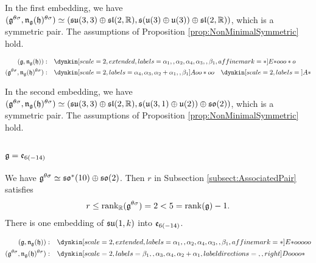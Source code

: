 In the first embedding, we have $(\mathfrak{g}^{\theta\sigma}, \mathfrak{n}_{\mathfrak{g}}(\mathfrak{h})^{\theta\sigma}) \simeq (\mathfrak{su}(3, 3) \oplus \mathfrak{sl}(2, \mathbb{R}), \mathfrak{s}(\mathfrak{u}(3)\oplus \mathfrak{u}(3)) \oplus \mathfrak{sl}(2, \mathbb{R}))$, which is a symmetric pair.
The assumptions of Proposition \ref{prop:NonMinimalSymmetric} hold.

\begin{align*}
	(\lie{g}, \lieNorm_{\lie{g}}(\lie{h})): \quad & \dynkin[scale=2, extended, labels={\alpha_1, , \alpha_2, \alpha_4, \alpha_3, , \beta_1}, affine mark=*]{E}{*ooo*o} \\
	(\lie{g}^{\theta\sigma}, \lieNorm_{\lie{g}}(\lie{h})^{\theta\sigma}): \quad & \dynkin[scale=2, labels={\alpha_4, \alpha_3, \alpha_2 + \alpha_1, , \beta_1}]{A}{oo*oo} \quad \dynkin[scale=2, labels={}]{A}{*}
\end{align*}

In the second embedding, we have $(\mathfrak{g}^{\theta\sigma}, \mathfrak{n}_{\mathfrak{g}}(\mathfrak{h})^{\theta\sigma}) \simeq (\mathfrak{su}(3, 3) \oplus \mathfrak{sl}(2, \mathbb{R}), \mathfrak{s}(\mathfrak{u}(3, 1)\oplus \mathfrak{u}(2)) \oplus \mathfrak{so}(2))$, which is a symmetric pair.
The assumptions of Proposition \ref{prop:NonMinimalSymmetric} hold.

\subsubsection{\texorpdfstring{$\mathfrak{g} = \mathfrak{e}_{6(-14)}$}{g=e6(-14)}}


We have $\mathfrak{g}^{\theta\sigma} \simeq \mathfrak{so}^*(10) \oplus \mathfrak{so}(2)$.
Then $r$ in Subsection \ref{subsect:AssociatedPair} satisfies
\begin{align*}
	r \leq \operatorname{rank}_{\mathbb{R}}(\mathfrak{g}^{\theta\sigma}) = 2 < 5 = \operatorname{rank}(\mathfrak{g}) - 1.
\end{align*}
There is one embedding of $\mathfrak{su}(1, k)$ into $\mathfrak{e}_{6(-14)}$.

\begin{align*}
	(\lie{g}, \lieNorm_{\lie{g}}(\lie{h})): \quad & \dynkin[scale=2, extended, labels={\alpha_1, , \alpha_2, \alpha_4, \alpha_3, , \beta_1}, affine mark=*]{E}{*ooooo} \\
	(\lie{g}^{\theta\sigma}, \lieNorm_{\lie{g}}(\lie{h})^{\theta\sigma}): \quad & \dynkin[scale=2, labels={\beta_1, , \alpha_3, \alpha_4, \alpha_2 + \alpha_1}, label directions={,,right}]{D}{oooo*}
\end{align*}

